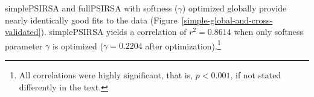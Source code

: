 \documentclass[10pt,a4paper]{article}
\begin{document}
simplePSIRSA and fullPSIRSA with softness ($\gamma$) optimized globally provide nearly identically good fits to the data  (Figure~\ref{simple-global-and-cross-validated}).
simplePSIRSA yields a correlation of $r^2 = 0.8614$ when only softness parameter $\gamma$ is optimized ($\gamma=0.2204$ after optimization).\footnote{All correlations were highly significant, that is, $p < 0.001$, if not stated differently in the text.} 
\end{document}
